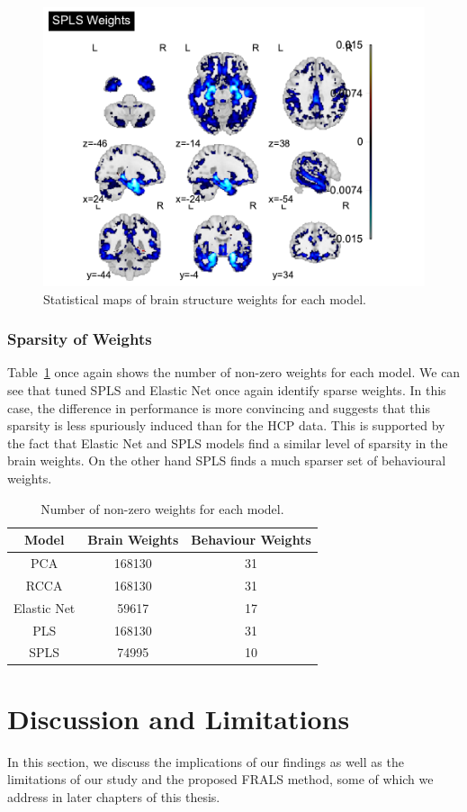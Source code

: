 \begin{figure}
\includegraphics[width=0.45\linewidth]{figures/adni/SPLS brain weights mosaic}
\caption{Statistical maps of brain structure weights for each model.}
\end{figure}

\subsubsection{Sparsity of Weights}

Table~\ref{tab:brain-behaviour-weights-adni} once again shows the number of non-zero \gls{weights} for each model.
We can see that tuned SPLS and Elastic Net once again identify sparse weights.
In this case, the difference in performance is more convincing and suggests that this sparsity is less spuriously induced than for the HCP data.
This is supported by the fact that Elastic Net and SPLS models find a similar level of sparsity in the brain weights.
On the other hand SPLS finds a much sparser set of behavioural weights.

\begin{table}[h]
\centering
\caption{Number of non-zero \gls{weights} for each model.}
\begin{tabular}{|c|c|c|}
\hline
Model & Brain Weights & Behaviour Weights \\
\hline
PCA & 168130 & 31 \\
RCCA & 168130 & 31 \\
Elastic Net & 59617 & 17 \\
PLS & 168130 & 31 \\
SPLS & 74995 & 10 \\
\hline
\end{tabular}\label{tab:brain-behaviour-weights-adni}
\end{table}

\section{Discussion and Limitations}

In this section, we discuss the implications of our findings as well as the limitations of our study and the proposed FRALS method, some of which we address in later chapters of this thesis.

